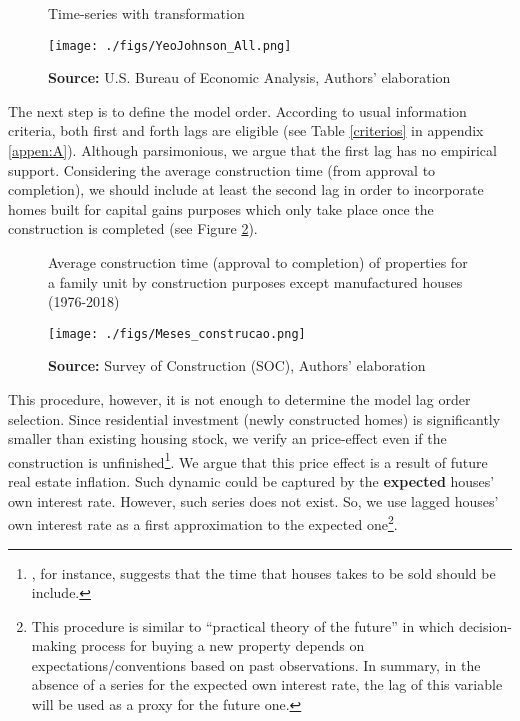 \documentclass[12pt, a4paper]{article}
\begin{document}
\begin{figure}[htb]
	\centering
	\caption{Time-series with \textcite{yeo_new_2000} transformation}
	\label{YeoJhonson}
	\texttt{[image: ./figs/YeoJohnson\_All.png]}
	\caption*{\textbf{Source:} U.S. Bureau of Economic Analysis, Authors' elaboration}
\end{figure}




The next step is to define the model order. According to usual information criteria, both first and forth lags are eligible (see Table \ref{criterios} in appendix \ref{appen:A}).
Although parsimonious, we argue that the first lag has no empirical support.
Considering the average construction time (from approval to completion), we should include at least the second lag in order to incorporate homes built for capital gains purposes which only take place once the construction is completed (see Figure \ref{meses}).

\begin{figure}[H]
	\centering
	\caption{Average construction time (approval to completion) of properties for a family unit by construction purposes except manufactured houses (1976-2018)}
    \label{meses}
	\texttt{[image: ./figs/Meses\_construcao.png]}
	\caption*{\textbf{Source:} Survey of Construction (SOC), Authors' elaboration}
\end{figure}

This procedure, however, it is not enough to determine the model lag order selection.
Since residential investment (newly constructed homes) is significantly smaller than existing housing stock, we verify an price-effect even if the construction is unfinished\footnote{\textcite{poterba_tax_1984}, for instance, suggests that the time that houses takes to be sold should be include.}.
We argue that this price effect is a result of future real estate inflation.
Such dynamic could be captured by the \textbf{expected} houses' own interest rate.
However, such series does not exist.
So, we use lagged houses' own interest rate as a first approximation to the expected one\footnote{This procedure is similar to \textcite{keynes_general_1937} ``practical theory of the future'' in which decision-making process for buying a new property depends on expectations/conventions based on past observations.
In summary, in the absence of a series for the expected own interest rate, the lag of this variable will be used as a proxy for the future one.}.
\end{document}
